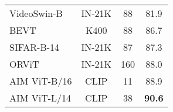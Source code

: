 \documentclass{article} \usepackage{iclr2023_conference,times}
\begin{document}
\begin{figure}
\begin{minipage}[t]{0.49\linewidth}
{\begin{tabular}{l|c|c|c}
					VideoSwin-B \citep{liu2022videoswin} & IN-21K & 88 & 81.9 \\
					BEVT \citep{wang2022bevt} & K400 & 88 & 86.7 \\
					SIFAR-B-14 \citep{sifar} & IN-21K & 87 & 87.3 \\
					\color{gray} ORViT \citep{orvit} & \color{gray} IN-21K &  \color{gray} 160 & \color{gray} 88.0 \\
					\hline
					AIM ViT-B/16 & CLIP & 11 & 88.9 \\
					AIM ViT-L/14 & CLIP & 38 & \textbf{90.6} \\
					\hline
				\end{tabular}
			}
			\label{tab:diving48}
		\end{minipage}\vspace{-2ex}
	\end{figure}
	\vspace{-1ex}
\end{document}
